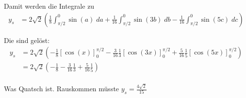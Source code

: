 \documentclass[a4paper,german,12pt,smallheadings]{scrartcl}
\begin{document}
\begin{enumerate}[a)]
    Damit werden die Integrale zu
    \begin{align*}
      y_s &= 2\sqrt{2} \left(
        \frac{1}{8} \int_{\pi/2}^{0} \sin(a) \; da
        + \frac{1}{16} \int_{\pi/2}^{0} \sin(3b) \; db 
      - \frac{1}{16} \int_{\pi/2}^{0} \sin(5c) \; dc\right)
    \end{align*}

    Die sind gelöst:
    \begin{align*}
      y_s &= 2\sqrt{2} \left(
      - \frac{1}{8} \left[\cos(x)\right]_{0}^{\pi/2}
      - \frac{3}{16} \frac{1}{3} \left[\cos(3x)\right]_{0}^{\pi/2}
      + \frac{5}{16} \frac{1}{5} \left[\cos(5x)\right]_{0}^{\pi/2}
    \right) \\
    &= 2\sqrt{2} \left(- \frac{1}{8}- \frac{3}{16}\frac{1}{3}+ \frac{5}{16}\frac{1}{5}\right) \\
    \end{align*}

    Was Quatsch ist. Rauskommen müsste $y_s = \frac{4 \sqrt{2}}{15}$



\end{enumerate}
\end{document}
